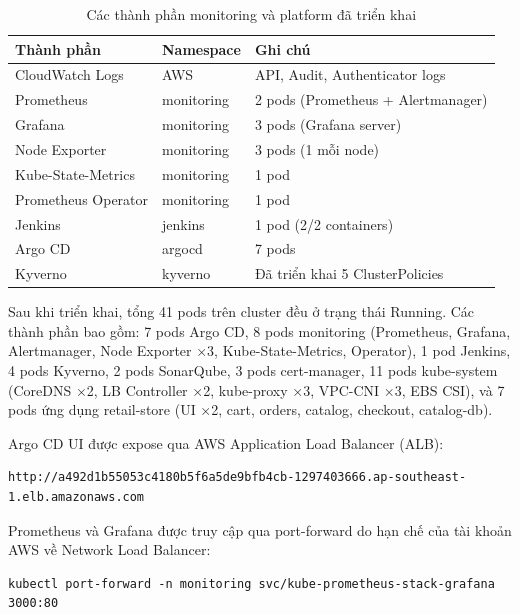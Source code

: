 \documentclass[13pt,a4paper,twoside]{extarticle}
\begin{document}
\begin{table}[H]
\centering
\begin{tabular}{@{}p{5cm} p{3cm} p{6.5cm}@{}}
\toprule
\textbf{Thành phần} & \textbf{Namespace} & \textbf{Ghi chú} \\
\midrule
CloudWatch Logs & AWS & API, Audit, Authenticator logs \\
Prometheus & monitoring & 2 pods (Prometheus + Alertmanager) \\
Grafana & monitoring & 3 pods (Grafana server) \\
Node Exporter & monitoring & 3 pods (1 mỗi node) \\
Kube-State-Metrics & monitoring & 1 pod \\
Prometheus Operator & monitoring & 1 pod \\
Jenkins & jenkins & 1 pod (2/2 containers) \\
Argo CD & argocd & 7 pods \\
Kyverno & kyverno & Đã triển khai 5 ClusterPolicies \\
\bottomrule
\end{tabular}
\caption{Các thành phần monitoring và platform đã triển khai}
\label{tab:monitoring}
\end{table}

Sau khi triển khai, tổng 41 pods trên cluster đều ở trạng thái Running. Các thành phần bao gồm: 7 pods Argo CD, 8 pods monitoring (Prometheus, Grafana, Alertmanager, Node Exporter ×3, Kube-State-Metrics, Operator), 1 pod Jenkins, 4 pods Kyverno, 2 pods SonarQube, 3 pods cert-manager, 11 pods kube-system (CoreDNS ×2, LB Controller ×2, kube-proxy ×3, VPC-CNI ×3, EBS CSI), và 7 pods ứng dụng retail-store (UI ×2, cart, orders, catalog, checkout, catalog-db).

Argo CD UI được expose qua AWS Application Load Balancer (ALB):
\begin{verbatim}
http://a492d1b55053c4180b5f6a5de9bfb4cb-1297403666.ap-southeast-1.elb.amazonaws.com
\end{verbatim}

Prometheus và Grafana được truy cập qua port-forward do hạn chế của tài khoản AWS về Network Load Balancer:
\begin{verbatim}
kubectl port-forward -n monitoring svc/kube-prometheus-stack-grafana 3000:80
\end{verbatim}
\end{document}
